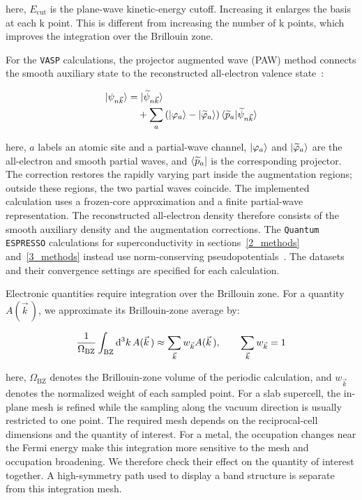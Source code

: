 here, $E_\mathrm{cut}$ is the plane-wave kinetic-energy cutoff.
Increasing it enlarges the basis at each k point.
This is different from increasing the number of k points,
which improves the integration over the Brillouin zone.

For the \texttt{VASP} calculations, the projector augmented wave (PAW) method connects the smooth auxiliary state to the reconstructed all-electron valence state~\cite{blochl1994projector,kresse1999ultrasoft}:

\begin{equation}
\begin{aligned}
    \ket{\psi_{n\vec{k}}}
    &=\ket{\widetilde{\psi}_{n\vec{k}}} \\
    &\quad+
    \sum_a\left(\ket{\varphi_a}-\ket{\widetilde{\varphi}_a}\right)
    \braket{\widetilde{p}_a|\widetilde{\psi}_{n\vec{k}}}
\end{aligned}
\label{PAW_reconstruction_method}
\end{equation}

here, $a$ labels an atomic site and a partial-wave channel,
$\ket{\varphi_a}$ and $\ket{\widetilde{\varphi}_a}$ are the all-electron and smooth partial waves,
and $\bra{\widetilde{p}_a}$ is the corresponding projector.
The correction restores the rapidly varying part inside the augmentation regions;
outside these regions, the two partial waves coincide.
The implemented calculation uses a frozen-core approximation and a finite partial-wave representation.
The reconstructed all-electron density therefore consists of the smooth auxiliary density and the augmentation corrections.
The \texttt{Quantum ESPRESSO} calculations for superconductivity in sections~\ref{2_methods} and~\ref{3_methods} instead use norm-conserving pseudopotentials~\cite{hamann2013optimized}.
The datasets and their convergence settings are specified for each calculation.

Electronic quantities require integration over the Brillouin zone.
For a quantity $A(\vec{k}\,)$, we approximate its Brillouin-zone average by:

\begin{equation}
    \frac{1}{\Omega_\mathrm{BZ}}
    \int_\mathrm{BZ}\mathrm{d}^3{k}\,A(\vec{k}\,)
    \approx \sum_{\vec{k}}w_{\vec{k}}A(\vec{k}\,),
    \qquad
    \sum_{\vec{k}}w_{\vec{k}}=1
\label{brillouin_zone_quadrature}
\end{equation}

here, $\Omega_\mathrm{BZ}$ denotes the Brillouin-zone volume of the periodic calculation,
and $w_{\vec{k}}$ denotes the normalized weight of each sampled point.
For a slab supercell, the in-plane mesh is refined while the sampling along the vacuum direction is usually restricted to one point.
The required mesh depends on the reciprocal-cell dimensions and the quantity of interest.
For a metal, the occupation changes near the Fermi energy make this integration more sensitive to the mesh and occupation broadening.
We therefore check their effect on the quantity of interest together.
A high-symmetry path used to display a band structure is separate from this integration mesh.

